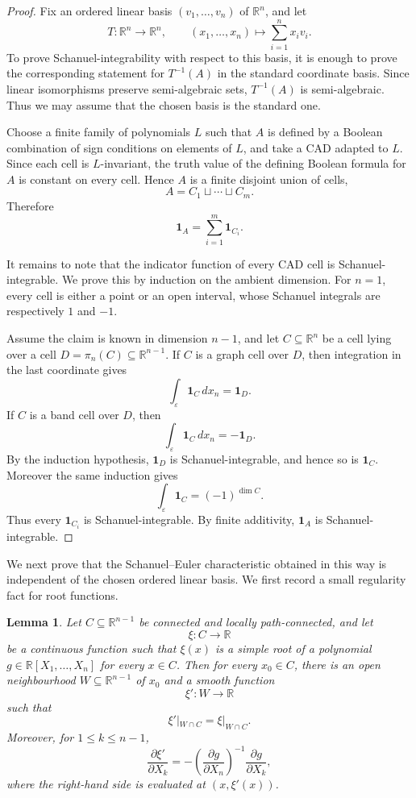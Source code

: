 \documentclass[11pt]{article}
\newtheorem{lemma}[theorem]{Lemma}
\theoremstyle{remark}
\newcommand{\1}{\mathbf 1}
\begin{document}
\begin{proof}
Fix an ordered linear basis \((v_1,\ldots,v_n)\) of \(\mathbb{R}^n\), and let
\[
  T:\mathbb{R}^n\longrightarrow \mathbb{R}^n,
  \qquad
  (x_1,\ldots,x_n)\longmapsto \sum_{i=1}^n x_i v_i .
\]
To prove Schanuel-integrability with respect to this basis, it is enough to
prove the corresponding statement for \(T^{-1}(A)\) in the standard coordinate
basis.  Since linear isomorphisms preserve semi-algebraic sets, \(T^{-1}(A)\)
is semi-algebraic.  Thus we may assume that the chosen basis is the standard
one.

Choose a finite family of polynomials \(L\) such that \(A\) is defined by a
Boolean combination of sign conditions on elements of \(L\), and take a CAD
adapted to \(L\).  Since each cell is \(L\)-invariant, the truth value of the
defining Boolean formula for \(A\) is constant on every cell.  Hence \(A\) is a
finite disjoint union of cells,
\[
  A = C_1\sqcup \cdots \sqcup C_m .
\]
Therefore
\[
  \mathbf{1}_A = \sum_{i=1}^m \mathbf{1}_{C_i}.
\]

It remains to note that the indicator function of every CAD cell is
Schanuel-integrable.  We prove this by induction on the ambient dimension.
For \(n=1\), every cell is either a point or an open interval, whose Schanuel
integrals are respectively \(1\) and \(-1\).

Assume the claim is known in dimension \(n-1\), and let
\(C\subseteq \mathbb{R}^n\) be a cell lying over a cell
\(D=\pi_n(C)\subseteq \mathbb{R}^{n-1}\).  If \(C\) is a graph cell over \(D\),
then integration in the last coordinate gives
\[
  \int_{\varepsilon} \mathbf{1}_C\,dx_n
  =
  \mathbf{1}_D .
\]
If \(C\) is a band cell over \(D\), then
\[
  \int_{\varepsilon} \mathbf{1}_C\,dx_n
  =
  -\mathbf{1}_D .
\]
By the induction hypothesis, \(\mathbf{1}_D\) is Schanuel-integrable, and hence
so is \(\mathbf{1}_C\).  Moreover the same induction gives
\[
  \int_{\varepsilon} \mathbf{1}_C
  =
  (-1)^{\dim C}.
\]
Thus every \(\mathbf{1}_{C_i}\) is Schanuel-integrable.  By finite additivity,
\(\mathbf{1}_A\) is Schanuel-integrable.
\end{proof}

We next prove that the Schanuel--Euler characteristic obtained in this way is
independent of the chosen ordered linear basis.  We first record a small
regularity fact for root functions.

\begin{lemma}
\label{lem:local-extension-root-function}
Let \(C\subseteq \mathbb{R}^{n-1}\) be connected and locally path-connected,
and let
\[
  \xi:C\longrightarrow \mathbb{R}
\]
be a continuous function such that \(\xi(x)\) is a simple root of a polynomial
\(g\in \mathbb{R}[X_1,\ldots,X_n]\) for every \(x\in C\).  Then for every
\(x_0\in C\), there is an open neighbourhood \(W\subseteq\mathbb{R}^{n-1}\) of
\(x_0\) and a smooth function
\[
  \xi':W\longrightarrow \mathbb{R}
\]
such that
\[
  \xi'|_{W\cap C}=\xi|_{W\cap C}.
\]
Moreover, for \(1\leq k\leq n-1\),
\[
  \frac{\partial \xi'}{\partial X_k}
  =
  -
  \left(
    \frac{\partial g}{\partial X_n}
  \right)^{-1}
  \frac{\partial g}{\partial X_k},
\]
where the right-hand side is evaluated at \((x,\xi'(x))\).
\end{lemma}
\end{document}
